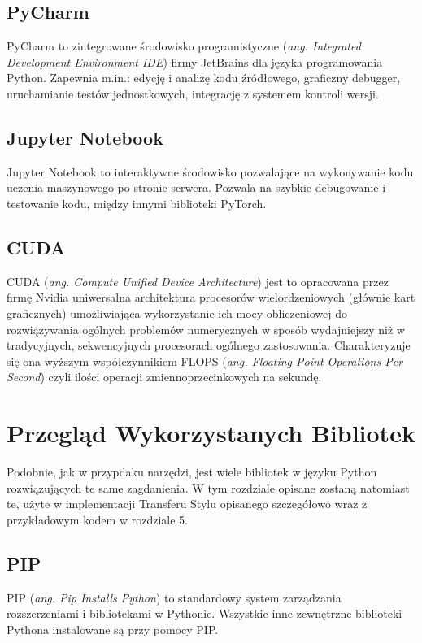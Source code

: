 \documentclass[openright]{xmgr}
\begin{document}
\section{PyCharm\label{s:dsssl}}
\indent \indent PyCharm to zintegrowane środowisko programistyczne (\textit{ang. Integrated Development Environment IDE}) firmy JetBrains dla języka programowania Python. Zapewnia m.in.: edycję i analizę kodu źródłowego, graficzny debugger, uruchamianie testów jednostkowych, integrację z systemem kontroli wersji. 
 
 \section{Jupyter Notebook\label{s:dsssl}}
 
\indent \indent Jupyter Notebook to interaktywne środowisko pozwalające na wykonywanie kodu uczenia maszynowego po stronie serwera. Pozwala na szybkie debugowanie i testowanie kodu, między innymi biblioteki PyTorch.

 \section{CUDA\label{s:dsssl}}
 
\indent \indent CUDA (\textit{ang. Compute Unified Device Architecture}) jest to opracowana przez firmę Nvidia uniwersalna architektura procesorów wielordzeniowych (głównie kart graficznych) umożliwiająca wykorzystanie ich mocy obliczeniowej do rozwiązywania ogólnych problemów numerycznych w sposób wydajniejszy niż w tradycyjnych, sekwencyjnych procesorach ogólnego zastosowania. Charakteryzuje się ona wyższym współczynnikiem FLOPS (\textit{ang. Floating Point Operations Per Second}) czyli ilości operacji zmiennoprzecinkowych na sekundę.




\chapter{Przegląd Wykorzystanych Bibliotek}


\indent \indent Podobnie, jak w przypdaku narzędzi, jest wiele bibliotek w języku Python rozwiązujących te same zagdanienia. 
W tym rozdziale opisane zostaną natomiast te, użyte w implementacji Transferu Stylu opisanego szczegółowo wraz z przykładowym kodem w rozdziale 5.

 \section{PIP\label{s:dsssl}}
 PIP (\textit{ang. Pip Installs Python}) to standardowy system zarządzania rozszerzeniami i bibliotekami w Pythonie. Wszystkie inne zewnętrzne biblioteki Pythona instalowane są przy pomocy PIP.
\end{document}

